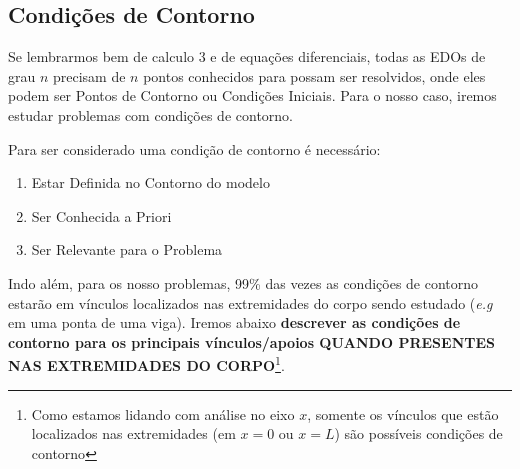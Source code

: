 \documentclass{article}
\begin{document}
\newpage
\subsection{Condições de Contorno}
Se lembrarmos bem de calculo 3 e de equações diferenciais, todas as EDOs de grau $n$ precisam de $n$ pontos conhecidos para possam ser resolvidos, onde eles podem ser Pontos de
Contorno ou Condições Iniciais. Para o nosso caso, iremos estudar problemas com condições de contorno.

Para ser considerado uma condição de contorno é necessário:
\begin{enumerate}
    \item Estar Definida no Contorno do modelo
    \item Ser Conhecida a Priori
    \item Ser Relevante para o Problema
\end{enumerate}

Indo além, para os nosso problemas, 99\% das vezes as condições de contorno estarão em vínculos localizados nas extremidades do corpo sendo estudado (\emph{e.g} em uma ponta de uma viga). Iremos abaixo
\textbf{descrever as condições de contorno para os principais vínculos/apoios QUANDO PRESENTES NAS EXTREMIDADES DO CORPO}\footnote{Como estamos lidando com análise no eixo $x$, somente
    os vínculos que estão localizados nas extremidades (em $x=0$ ou $x=L$) são possíveis condições de contorno}.
\end{document}
